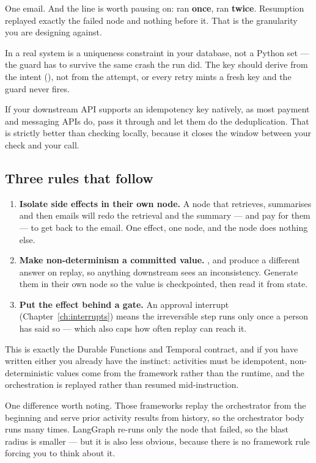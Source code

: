 One email. And the  line is worth pausing on:  ran
\textbf{once},  ran \textbf{twice}. Resumption replayed exactly
the failed node and nothing before it. That is the granularity you are designing
against.

\begin{note}
In a real system  is a uniqueness constraint in your
database, not a Python set --- the guard has to survive the same crash the run
did. The key should derive from the intent (), not from
the attempt, or every retry mints a fresh key and the guard never fires.

If your downstream API supports an idempotency key natively, as most payment and
messaging APIs do, pass it through and let them do the deduplication. That is
strictly better than checking locally, because it closes the window between your
check and your call.
\end{note}

\subsection{Three rules that follow}
\label{sec:replay-rules}

\begin{enumerate}[leftmargin=1.4em]
\item \textbf{Isolate side effects in their own node.} A node that retrieves,
      summarises and then emails will redo the retrieval and the summary --- and
      pay for them --- to get back to the email. One effect, one node, and the
      node does nothing else.
\item \textbf{Make non-determinism a committed value.} ,
       and  produce a different answer on replay, so
      anything downstream sees an inconsistency. Generate them in their own node
      so the value is checkpointed, then read it from state.
\item \textbf{Put the effect behind a gate.} An approval interrupt
      (Chapter~\ref{ch:interrupts}) means the irreversible step runs only once a
      person has said so --- which also caps how often replay can reach it.
\end{enumerate}

\begin{dotnetbox}
This is exactly the Durable Functions and Temporal contract, and if you have
written either you already have the instinct: activities must be idempotent,
non-deterministic values come from the framework rather than the runtime, and the
orchestration is replayed rather than resumed mid-instruction.

One difference worth noting. Those frameworks replay the orchestrator from the
beginning and serve prior activity results from history, so the orchestrator body
runs many times. LangGraph re-runs only the node that failed, so the blast radius
is smaller --- but it is also less obvious, because there is no framework rule
forcing you to think about it.
\end{dotnetbox}

